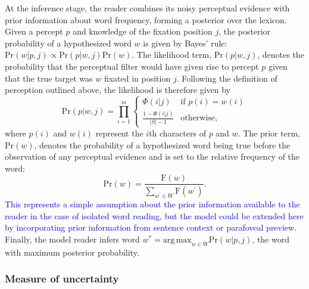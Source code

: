 \documentclass[doc,biblatex]{apa7}
\newcommand\newmaterial[1]{\textcolor{blue}{#1}}
\begin{document}
At the inference stage, the reader combines its noisy perceptual evidence with prior information about word frequency, forming a posterior over the lexicon. Given a percept $p$ and knowledge of the fixation position $j$, the posterior probability of a hypothesized word $w$ is given by Bayes' rule: $\mathrm{Pr}(w|p,j) \propto \mathrm{Pr}(p|w,j) \mathrm{Pr}(w)$. The likelihood term, $\mathrm{Pr}(p|w,j)$, denotes the probability that the perceptual filter would have given rise to percept $p$ given that the true target was $w$ fixated in position $j$. Following the definition of perception outlined above, the likelihood is therefore given by
\begin{equation}
\mathrm{Pr}(p|w,j) = \prod_{i=1}^m
\begin{cases}
       \Phi(i|j)                   & \text{if $p(i) = w(i)$} \\
       \frac{1 - \Phi(i|j)}{|S|-1} & \text{otherwise,}
\end{cases}
\label{likelihood}
\end{equation}
where $p(i)$ and $w(i)$ represent the $i$th characters of $p$ and $w$. The prior term, $\mathrm{Pr}(w)$, denotes the probability of a hypothesized word being true before the observation of any perceptual evidence and is set to the relative frequency of the word:
\begin{equation}
\mathrm{Pr}(w) = \frac{\mathrm{F}(w)}{\sum_{w^\prime \in W} \mathrm{F}(w^\prime)}.
\label{prior}
\end{equation}
\newmaterial{This represents a simple assumption about the prior information available to the reader in the case of isolated word reading, but the model could be extended here by incorporating prior information from sentence context or parafoveal preview}. Finally, the model reader infers word $w^\ast = \mathrm{arg\,max}_{w \in W} \mathrm{Pr}(w|p,j)$, the word with maximum posterior probability.

\subsubsection{Measure of uncertainty}
\end{document}
